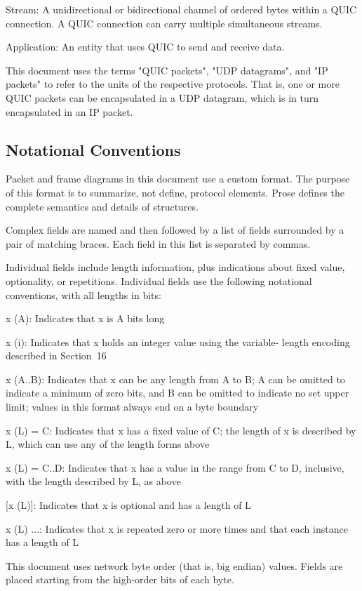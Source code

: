 \documentclass{article}
\begin{document}
Stream:  A unidirectional or bidirectional channel of ordered bytes within a QUIC connection.  A QUIC connection can carry multiple simultaneous streams.

Application:  An entity that uses QUIC to send and receive data.

This document uses the terms "QUIC packets", "UDP datagrams", and "IP packets" to refer to the units of the respective protocols.  That is, one or more QUIC packets can be encapsulated in a UDP datagram, which is in turn encapsulated in an IP packet.

\subsection{Notational Conventions}

Packet and frame diagrams in this document use a custom format.  The purpose of this format is to summarize, not define, protocol elements.  Prose defines the complete semantics and details of structures.

Complex fields are named and then followed by a list of fields surrounded by a pair of matching braces.  Each field in this list is separated by commas.

Individual fields include length information, plus indications about fixed value, optionality, or repetitions.  Individual fields use the following notational conventions, with all lengths in bits:

x (A):  Indicates that x is A bits long

x (i):  Indicates that x holds an integer value using the variable- length encoding described in Section~16

x (A..B):  Indicates that x can be any length from A to B; A can be omitted to indicate a minimum of zero bits, and B can be omitted to indicate no set upper limit; values in this format always end on a byte boundary

x (L) = C:  Indicates that x has a fixed value of C; the length of x is described by L, which can use any of the length forms above

x (L) = C..D:  Indicates that x has a value in the range from C to D, inclusive, with the length described by L, as above

[x (L)]:  Indicates that x is optional and has a length of L

x (L) ...:  Indicates that x is repeated zero or more times and that each instance has a length of L

This document uses network byte order (that is, big endian) values. Fields are placed starting from the high-order bits of each byte.
\end{document}
